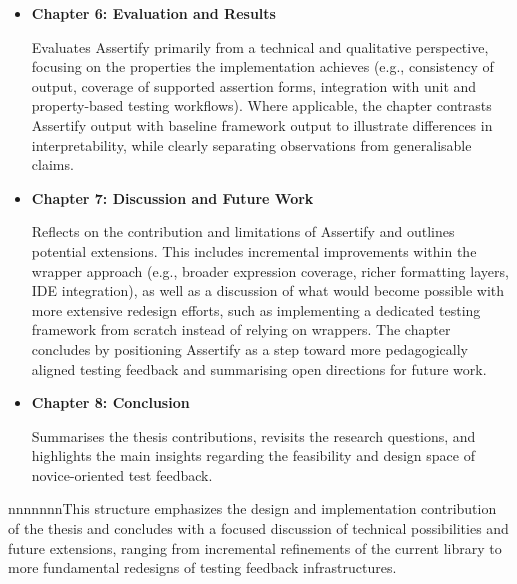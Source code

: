 \begin{itemize}
    \item \textbf{Chapter 6: Evaluation and Results}
        \begin{justify}Evaluates Assertify primarily from a technical and qualitative perspective, focusing on the properties the implementation achieves
            (e.g., consistency of output, coverage of supported assertion forms, integration with unit and property-based testing workflows).
            Where applicable, the chapter contrasts Assertify output with baseline framework output to illustrate differences in interpretability,
            while clearly separating observations from generalisable claims.\end{justify}

    \item \textbf{Chapter 7: Discussion and Future Work}
        \begin{justify}Reflects on the contribution and limitations of Assertify and outlines potential extensions.
            This includes incremental improvements within the wrapper approach (e.g., broader expression coverage, richer formatting layers, IDE integration),
            as well as a discussion of what would become possible with more extensive redesign efforts, such as implementing a dedicated testing framework from scratch instead of relying on wrappers.
            The chapter concludes by positioning Assertify as a step toward more pedagogically aligned testing feedback and summarising open directions for future work.\end{justify}

    \item \textbf{Chapter 8: Conclusion}
        \begin{justify}Summarises the thesis contributions, revisits the research questions, and highlights the main insights regarding the feasibility and design space of novice-oriented test feedback.\end{justify}
\end{itemize}

\noindent nnnnnnnThis structure emphasizes the design and implementation contribution of the thesis and concludes with a focused discussion of technical possibilities and future extensions,
ranging from incremental refinements of the current library to more fundamental redesigns of testing feedback infrastructures.


